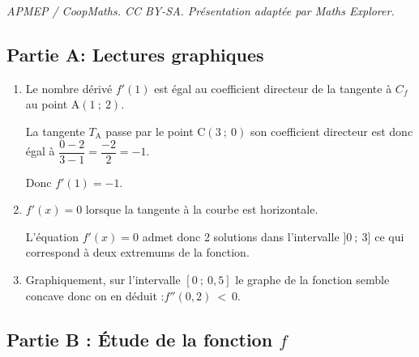 \documentclass[10pt]{article}
\begin{document}
\noindent\textit{APMEP / CoopMaths. CC BY-SA. Présentation adaptée par Maths Explorer.}\par\medskip
\medskip

\subsection*{Partie A: Lectures graphiques}


\begin{enumerate}
\item Le nombre dérivé $f'(1)$ est égal au coefficient directeur de la tangente à $C_{f}$ au point $\mathrm{A}(1 ~;~ 2)$.

La tangente $T_{\mathrm{A}}$ passe par le point $\mathrm{C}(3 ~;~ 0)$ son coefficient directeur est donc égal à $\dfrac{0-2}{3-1}= \dfrac{-2}{2}=-1$.

Donc $f'(1)= - 1$.
\item  $f'(x)=0$ lorsque la tangente à la courbe est horizontale.

L'équation $f'(x)=0$ admet donc 2 solutions dans l'intervalle $]0 ~;~ 3]$ ce qui correspond à deux extremums de la fonction.
\item Graphiquement, sur l'intervalle $[0~;~0,5]$ le graphe de la fonction semble concave donc on en déduit :\quad $f''(0,2)~<~0$.
\end{enumerate}

\subsection*{ Partie B : Étude de la fonction \boldmath $f$\unboldmath}
\end{document}
